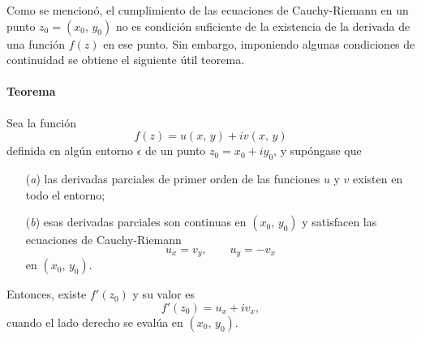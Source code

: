 \documentclass[a4paper]{report}
\begin{document}
Como se mencionó, el cumplimiento de las ecuaciones de Cauchy-Riemann en un punto \(z_0=(x_0,\,y_0)\) no es condición suficiente de la existencia de la derivada de una función \(f(z)\) en ese punto. Sin embargo, imponiendo algunas condiciones de continuidad se obtiene el siguiente útil teorema.

\paragraph{Teorema} Sea la función
\[
 f(z)=u(x,\,y)+iv(x,\,y)
\]
definida en algún entorno \(\epsilon\) de un punto \(z_0=x_0+iy_0\), y supóngase que 
\begin{enumerate}
 \item[(\textit{a})] las derivadas parciales de primer orden de las funciones \(u\) y \(v\) existen en todo el entorno;
 \item[(\textit{b})] esas derivadas parciales son continuas en \((x_0,\,y_0)\) y satisfacen las ecuaciones de Cauchy-Riemann
 \[
 u_x=v_y,
 \qquad
 u_y=-v_x
\]
en \((x_0,\,y_0)\).  
\end{enumerate}
Entonces, existe \(f'(z_0)\) y su valor es
\begin{equation}\label{eq:cauchy_riemann_f_derivative}
 f'(z_0)=u_x+iv_x, 
\end{equation}
cuando el lado derecho se evalúa en \((x_0,\,y_0)\).
\end{document}
